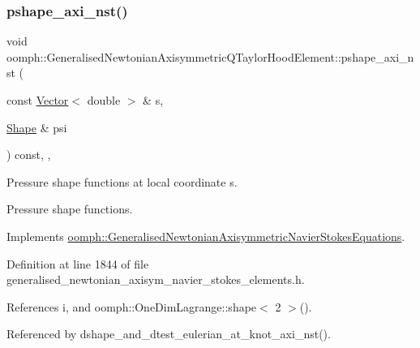 \subsubsection{\texorpdfstring{pshape\+\_\+axi\+\_\+nst()}{pshape\_axi\_nst()}\hspace{0.1cm}{\footnotesize\ttfamily [1/2]}}
{\footnotesize\ttfamily void oomph\+::\+Generalised\+Newtonian\+Axisymmetric\+Q\+Taylor\+Hood\+Element\+::pshape\+\_\+axi\+\_\+nst (\begin{DoxyParamCaption}\item[{const \hyperlink{classoomph_1_1Vector}{Vector}$<$ double $>$ \&}]{s,  }\item[{\hyperlink{classoomph_1_1Shape}{Shape} \&}]{psi }\end{DoxyParamCaption}) const\hspace{0.3cm}{\ttfamily [inline]}, {\ttfamily [protected]}, {\ttfamily [virtual]}}



Pressure shape functions at local coordinate s. 

Pressure shape functions. 

Implements \hyperlink{classoomph_1_1GeneralisedNewtonianAxisymmetricNavierStokesEquations_a45e6df6b18daa524c32659572470cc7b}{oomph\+::\+Generalised\+Newtonian\+Axisymmetric\+Navier\+Stokes\+Equations}.



Definition at line 1844 of file generalised\+\_\+newtonian\+\_\+axisym\+\_\+navier\+\_\+stokes\+\_\+elements.\+h.



References i, and oomph\+::\+One\+Dim\+Lagrange\+::shape$<$ 2 $>$().



Referenced by dshape\+\_\+and\+\_\+dtest\+\_\+eulerian\+\_\+at\+\_\+knot\+\_\+axi\+\_\+nst().

\mbox{\label{classoomph_1_1GeneralisedNewtonianAxisymmetricQTaylorHoodElement_a1a4c61c01154cc2e95da02ba03495b44}} 
